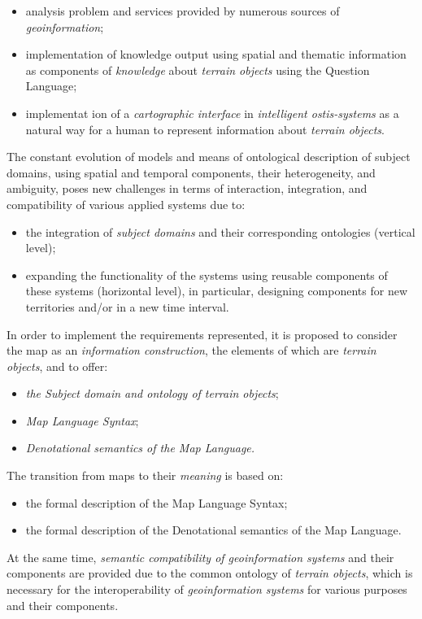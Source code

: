 \documentclass{article}
\date{}
\begin{document}
\begin{multicols}{2}

\begin{itemize}
    \item analysis problem and services provided by numerous sources of \textit{geoinformation};
    \item implementation of knowledge output using spatial and thematic information as components of \textit{knowledge} about \textit{terrain objects} using the Question Language;
    \item implementat ion of a \textit{cartographic interface} in \textit{intelligent ostis-systems} as a natural way for a human to represent information about \textit{terrain objects}.
\end{itemize}
\par
The constant evolution of models and means of ontological description of subject domains, using spatial and temporal components, their heterogeneity, and ambiguity, poses new challenges in terms of interaction, integration, and compatibility of various applied systems due to:
\begin{itemize}
    \item the integration of \textit{subject domains} and their corresponding ontologies (vertical level);
    \item expanding the functionality of the systems using
reusable components of these systems (horizontal
level), in particular, designing components for new
territories and/or in a new time interval.
\end{itemize}
\par
In order to implement the requirements represented,
it is proposed to consider the map as an \textit{information construction}, the elements of which are \textit{terrain objects}, and to offer:
\begin{itemize}
    \item \textit{the Subject domain and ontology of terrain objects};
    \item \textit{Map Language Syntax};
    \item \textit{Denotational semantics of the Map Language.}
\end{itemize}
\par
The transition from maps to their \textit{meaning} is based on:
\begin{itemize}
    \item the formal description of the Map Language Syntax;
    \item the formal description of the Denotational semantics
of the Map Language.
\end{itemize}
\par
At the same time, \textit{semantic compatibility of geoinformation systems} and their components are provided due to the common ontology of \textit{terrain objects}, which is necessary for the interoperability of \textit{geoinformation systems} for various purposes and their components.


\end{multicols}
\end{document}
